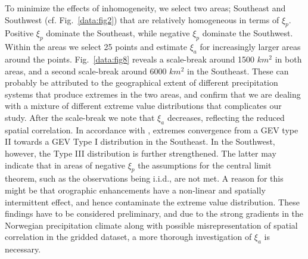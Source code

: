 \documentclass[12pt,a4paper,english]{article}
\begin{document}
To minimize the effects of inhomogeneity, we select two areas; Southeast and Southwest (cf. Fig.~\ref{data:fig2}) that are relatively homogeneous in terms of $\xi_{p}$. Positive $\xi_{p}$ dominate the Southeast, while negative $\xi_{p}$ dominate the Southwest. Within the areas we select 25 points and estimate $\xi_{a}$ for increasingly larger areas around the points. Fig.~\ref{data:fig8} reveals a scale-break around 1500 $km^2$ in both areas, and a second scale-break around 6000 $km^2$ in the Southeast. These can probably be attributed to the geographical extent of different precipitation systems that produce extremes in the two areas, and confirm that we are dealing with a mixture of different extreme value distributions that complicates our study. After the scale-break we note that $\xi_{a}$ decreases, reflecting the reduced spatial correlation. In accordance with \cite{Overeemetal2010}, extremes convergence from a GEV type II towards a GEV Type I distribution in the Southeast. In the Southwest, however, the Type III distribution is further strengthened. %
The latter may indicate that in areas of negative $\xi_{p}$ the assumptions for the central limit theorem, such as the observations being i.i.d., are not met. A reason for this might be that orographic enhancements have a non-linear and spatially intermittent effect, and hence contaminate the extreme value distribution. 
These findings have to be considered preliminary, and due to the strong gradients in the Norwegian precipitation climate along with possible misrepresentation of spatial correlation in the gridded dataset, a more thorough investigation of $\xi_{a}$ is necessary.   

\vspace{5mm}
\end{document}
